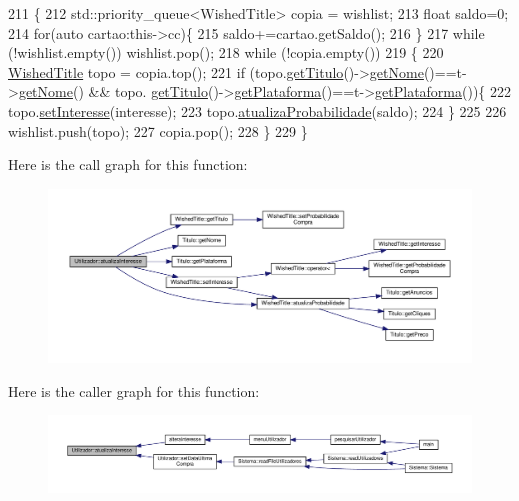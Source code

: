 \begin{DoxyCode}
211                                                                    \{
212     std::priority\_queue<WishedTitle> copia = wishlist;
213     \textcolor{keywordtype}{float} saldo=0;
214     \textcolor{keywordflow}{for}(\textcolor{keyword}{auto} cartao:this->cc)\{
215         saldo+=cartao.getSaldo();
216     \}
217     \textcolor{keywordflow}{while} (!wishlist.empty()) wishlist.pop();
218     \textcolor{keywordflow}{while} (!copia.empty())
219     \{
220         \hyperlink{classWishedTitle}{WishedTitle} topo = copia.top();
221         \textcolor{keywordflow}{if} (topo.\hyperlink{classWishedTitle_a9ca6e92a26bb2f319a39d5a03b0c42bd}{getTitulo}()->\hyperlink{classTitulo_acb79279860b3404c6419697df5f860cb}{getNome}()==t->\hyperlink{classTitulo_acb79279860b3404c6419697df5f860cb}{getNome}() && topo.
      \hyperlink{classWishedTitle_a9ca6e92a26bb2f319a39d5a03b0c42bd}{getTitulo}()->\hyperlink{classTitulo_a2a57a31d40c5df012b3c6e2451c253dd}{getPlataforma}()==t->\hyperlink{classTitulo_a2a57a31d40c5df012b3c6e2451c253dd}{getPlataforma}())\{
222             topo.\hyperlink{classWishedTitle_ae81814e2837a03f1bcbc1064da0e652e}{setInteresse}(interesse);
223             topo.\hyperlink{classWishedTitle_a8be5446371add65ba4de2c69c84cb387}{atualizaProbabilidade}(saldo);
224         \}
225 
226         wishlist.push(topo);
227         copia.pop();
228     \}
229 \}
\end{DoxyCode}
Here is the call graph for this function\+:
\nopagebreak
\begin{figure}[H]
\begin{center}
\leavevmode
\includegraphics[width=350pt]{classUtilizador_a4617169b0764e48f8b95d4d8aa12bf19_cgraph}
\end{center}
\end{figure}
Here is the caller graph for this function\+:
\nopagebreak
\begin{figure}[H]
\begin{center}
\leavevmode
\includegraphics[width=350pt]{classUtilizador_a4617169b0764e48f8b95d4d8aa12bf19_icgraph}
\end{center}
\end{figure}
\mbox{\label{classUtilizador_a82b216e27c9716cce49a7b98d59445cb}} 
